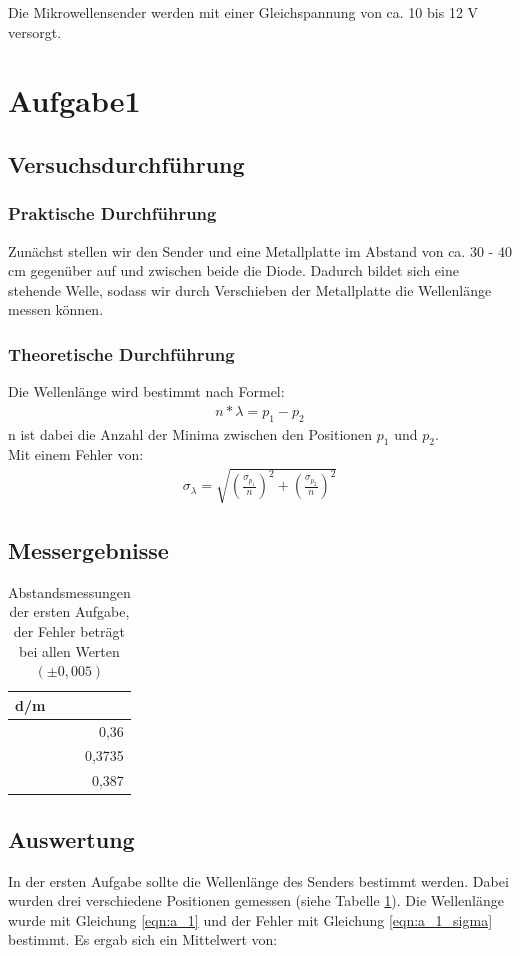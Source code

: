 \documentclass[12pt]{scrartcl}
\begin{document}
Die Mikrowellensender werden mit einer Gleichspannung von ca. 10 bis 12 V versorgt.
\section{Aufgabe1}
\subsection{Versuchsdurchführung}
\subsubsection{Praktische Durchführung}
Zunächst stellen wir den Sender und eine Metallplatte im Abstand von ca. 30 - 40 cm gegenüber auf und zwischen beide die Diode. Dadurch bildet sich eine stehende Welle, sodass wir durch Verschieben der Metallplatte die Wellenlänge messen können.
\subsubsection{Theoretische Durchführung}
Die Wellenlänge wird bestimmt nach Formel:
\begin{align}
n*\lambda = p_1 - p_2
\label{eqn:a_1}
\end{align}
n ist dabei die Anzahl der Minima zwischen den Positionen $p_1$ und $p_2$.\\
Mit einem Fehler von:
\begin{align}
\sigma_{\lambda} = \sqrt{
\left(\frac{\sigma_{p_1}}{n}\right)^2+
\left(\frac{\sigma_{p_2}}{n}\right)^2}
\label{eqn:a_1_sigma}
\end{align}
\subsection{Messergebnisse}
\begin{table}[H]
\caption{Abstandsmessungen der ersten Aufgabe, der Fehler beträgt bei allen Werten $(\pm 0,005)$}
\centering
\begin{tabular}{|r|}
\hline
\multicolumn{1}{|l|}{d/m} \\ \hline
0,36 \\ \hline
0,3735 \\ \hline
0,387 \\ \hline
\end{tabular}
\label{tab:a_1}
\end{table}
\subsection{Auswertung}
In der ersten Aufgabe sollte die Wellenlänge des Senders bestimmt werden. Dabei wurden drei verschiedene Positionen gemessen (siehe Tabelle \ref{tab:a_1}). Die Wellenlänge wurde mit Gleichung \ref{eqn:a_1} und der Fehler mit Gleichung \ref{eqn:a_1_sigma} bestimmt. Es ergab sich ein Mittelwert von:
\end{document}
